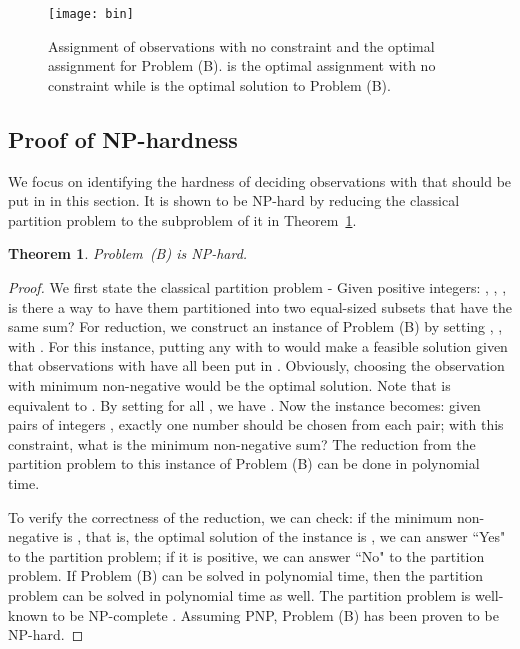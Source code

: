 \documentclass[conference]{IEEEtran}
\newtheorem{theorem}{Theorem}[section]
\begin{document}
\begin{figure}[tb]
    \begin{center}
    \setlength{\unitlength}{1in}
    \texttt{[image: bin]}
    \end{center}
\vspace{-1.2em}
\caption{Assignment of observations with no constraint and the optimal assignment for Problem (B).  is the optimal assignment with no constraint while  is the optimal solution to Problem (B).}
\label{fig:bin}
\vspace{-1.5em}
\end{figure} 

\subsection{Proof of NP-hardness}
\label{subsec:NP}

We focus on identifying the hardness of deciding observations with  that should be put in  in this section. It is shown to be NP-hard by reducing the classical partition problem \cite{Garey} to the subproblem of it in Theorem~\ref{thm:NP}. 

\begin{theorem}
Problem~(B) is NP-hard.
\label{thm:NP}
\end{theorem}

\begin{proof}
We first state the classical partition problem \cite{Garey} - Given  positive integers: , , , is there a way to have them partitioned into two equal-sized subsets that have the same sum? For reduction, we construct an instance of Problem (B) by setting , ,  with . For this instance, putting any  with  to  would make a feasible solution given that observations with  have all been put in . Obviously, choosing the observation with minimum non-negative  would be the optimal solution. Note that  is equivalent to . By setting  for all , we have . Now the instance becomes: given  pairs of integers , exactly one number should be chosen from each pair; with this constraint, what is the minimum non-negative sum? The reduction from the partition problem to this instance of Problem (B) can be done in polynomial time.

To verify the correctness of the reduction, we can check: if the minimum non-negative  is , that is, the optimal solution of the instance is , we can answer ``Yes" to the partition problem; if it is positive, we can answer ``No" to the partition problem. If Problem (B) can be solved in polynomial time, then the partition problem can be solved in polynomial time as well. The partition problem is well-known to be NP-complete \cite{Garey}. Assuming PNP, Problem (B) has been proven to be NP-hard.
\end{proof}
\end{document}

